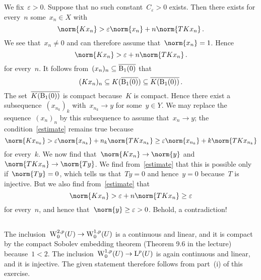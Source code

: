 \section{}





\subsection{}


We fix~$\varepsilon > 0$.
Suppose that no such constant~$C_\varepsilon > 0$ exists.
Then there exists for every~$n$ some~$x_n \in X$ with
\[
  \norm{ K x_n }
  >
  \varepsilon
  \norm{x_n}
  +
  n
  \norm{ T K x_n } \,.
\]
We see that~$x_n \neq 0$ and can therefore assume that~$\norm{x_n} = 1$.
Hence
\begin{equation}
  \label{estimate}
  \norm{ K x_n }
  >
  \varepsilon
  +
  n
  \norm{ T K x_n } \,.
\end{equation}
for every~$n$.
It follows from~$(x_n)_n \subseteq \overline{\operatorname{B}_{1}(0)}$ that
\[
  (K x_n)_n
  \subseteq
  K( \overline{\operatorname{B}_{1}(0)} )
  \subseteq
  \overline{ K(\operatorname{B}_{1}(0)) } \,.
\]
The set~$\overline{ K(\operatorname{B}_{1}(0)) }$ is compact because~$K$ is compact.
Hence there exist a subsequence~$(x_{n_k})_k$ with~$x_{n_k} \to y$ for some~$y \in Y$.
We may replace the sequence~$(x_n)_n$ by this subsequence to assume that~$x_n \to y$;
the condition~\eqref{estimate} remains true because
\[
  \norm{ K x_{n_k} }
  >
  \varepsilon
  \norm{x_{n_k}}
  +
  n_k
  \norm{ T K x_{n_k} }
  \geq
  \varepsilon
  \norm{x_{n_k}}
  +
  k
  \norm{ T K x_{n_k} }
\]
for every~$k$.
We now find that~$\norm{K x_n} \to \norm{y}$ and~$\norm{T K x_n} \to \norm{T y}$.
We find from~\eqref{estimate} that this is possible only if~$\norm{T y} = 0$, which tells us that~$Ty = 0$ and hence~$y = 0$ because~$T$ is injective.
But we also find from~\eqref{estimate} that
\[
  \norm{ K x_n }
  >
  \varepsilon
  +
  n
  \norm{ T K x_n }
  \geq
  \varepsilon
\]
for every~$n$, and hence that~$\norm{y} \geq \varepsilon > 0$.
Behold, a contradiction!





\subsection{}

The inclusion~$\operatorname{W}^{2,p}_0(U) \to \operatorname{W}^{1,p}_0(U)$ is a continuous and linear, and it is compact by the compact Sobolev embedding theorem (Theorem 9.6 in the lecture) because~$1 < 2$.
The inclusion~$\operatorname{W}^{1,p}_0(U) \to \operatorname{L}^p(U)$ is again continuous and linear, and it is injective.
The given statement therefore follows from part~(i) of this exercise.





